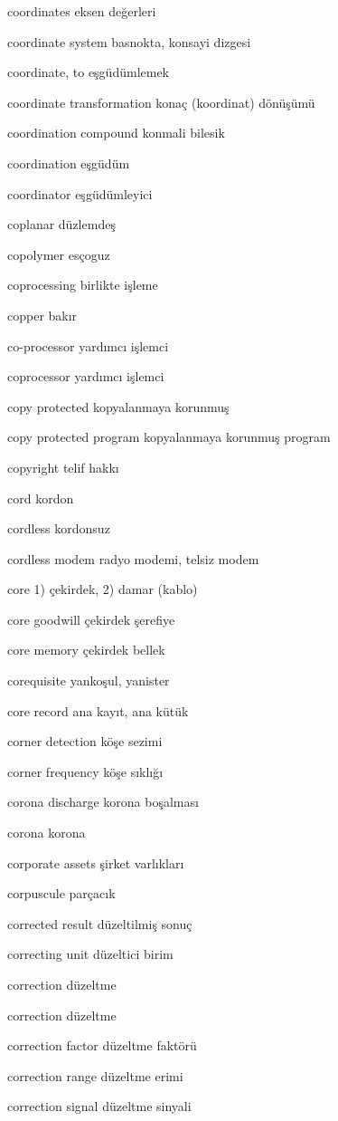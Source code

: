 \documentclass[12pt,fleqn]{article}\usepackage{../../common}
\begin{document}
coordinates eksen değerleri

coordinate system basnokta, konsayi dizgesi

coordinate, to eşgüdümlemek

coordinate transformation konaç (koordinat) dönüşümü

coordination compound konmali bilesik

coordination eşgüdüm

coordinator eşgüdümleyici

coplanar düzlemdeş

copolymer esçoguz

coprocessing birlikte işleme

copper bakır

co-processor yardımcı işlemci

coprocessor yardımcı işlemci

copy protected kopyalanmaya korunmuş

copy protected program kopyalanmaya korunmuş program

copyright telif hakkı

cord kordon

cordless kordonsuz

cordless modem radyo modemi, telsiz modem

core 1) çekirdek, 2) damar (kablo)

core goodwill çekirdek şerefiye

core memory çekirdek bellek

corequisite yankoşul, yanister

core record ana kayıt, ana kütük

corner detection köşe sezimi

corner frequency köşe sıklığı

corona discharge korona boşalması

corona korona

corporate assets şirket varlıkları

corpuscule parçacık

corrected result düzeltilmiş sonuç

correcting unit düzeltici birim

correction düzeltme

correction düzeltme

correction factor düzeltme faktörü

correction range düzeltme erimi

correction signal düzeltme sinyali
\end{document}
